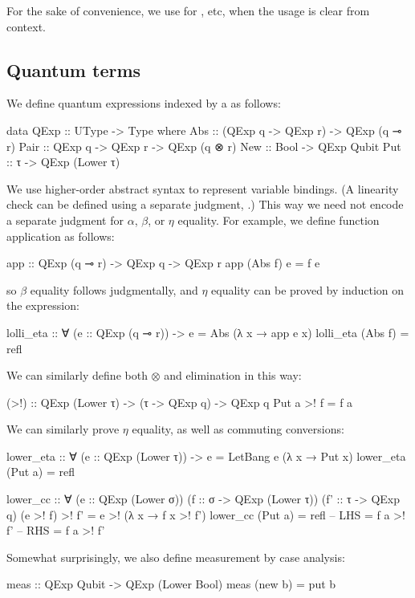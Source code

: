 \documentclass{article}
\begin{document}
For the sake of convenience, we use  for , etc,
when the usage is clear from context.

\subsection{Quantum terms}


We define quantum expressions indexed by a  as follows:
\begin{haskell}
data QExp :: UType -> Type where
  Abs   :: (QExp q -> QExp r) -> QExp (q ⊸ r)
  Pair  :: QExp q -> QExp r -> QExp (q ⊗ r)
  New   :: Bool -> QExp Qubit
  Put     :: τ -> QExp (Lower τ)
\end{haskell}
We use higher-order abstract syntax to represent variable bindings. (A linearity
check can be defined using a separate judgment, .) This way we need not encode a separate judgment for $\alpha$, $\beta$,
or $\eta$ equality. For example, we define function application as follows:
\begin{haskell}
app :: QExp (q ⊸ r) -> QExp q -> QExp r
app (Abs f) e = f e
\end{haskell}
so $β$ equality follows judgmentally, and $η$ equality can be proved by
induction on the expression:
\begin{haskell}
lolli_eta :: ∀ (e :: QExp (q ⊸ r)) -> e = Abs (λ x → app e x)
lolli_eta (Abs f) = refl
\end{haskell}


We can similarly define both $⊗$ and  elimination in this way:
\begin{haskell}
(>!) :: QExp (Lower τ) -> (τ -> QExp q) -> QExp q
Put a >! f = f a
\end{haskell}

We can similarly prove $η$ equality, as well as commuting conversions:
\begin{haskell}
lower_eta :: ∀ (e :: QExp (Lower τ)) -> e = LetBang e (λ x → Put x)
lower_eta (Put a) = refl

lower_cc :: ∀ (e :: QExp (Lower σ)) (f :: σ -> QExp (Lower τ)) (f' :: τ -> QExp q)
             (e >! f) >! f' = e >! (λ x → f x >! f')
lower_cc (Put a) = refl -- LHS = f a >! f'
                        -- RHS = f a >! f'
\end{haskell}

Somewhat surprisingly, we also define measurement by case analysis:
\begin{haskell}
meas :: QExp Qubit -> QExp (Lower Bool)
meas (new b) = put b
\end{haskell}
\end{document}
